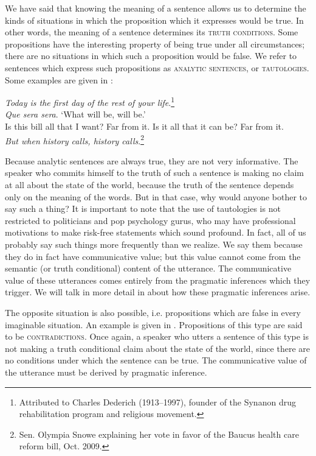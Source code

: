We have said that knowing the meaning of a sentence allows us to determine the kinds of situations in which the proposition which it expresses would be true. In other words, the meaning of a sentence determines its \textsc{truth conditions}. Some propositions have the interesting property of being true under all circumstances; there are no situations in which such a proposition would be false. We refer to sentences which express such propositions as \textsc{analytic sentences}, or \textsc{tautologies}. Some examples are given in :


\ea \label{ex:3.3}
\ea \textit{Today is the first day of the rest of your life}.\footnote{Attributed to Charles Dederich (1913–1997), founder of the Synanon drug rehabilitation program and religious movement.}\\
\ex \textit{Que sera sera}. ‘What will be, will be.’\\
\ex Is this bill all that I want? Far from it. Is it all that it can be? Far from it.\\
  \textit{But when history calls, history calls}.\footnote{Sen. Olympia Snowe explaining her vote in favor of the Baucus health care reform bill, Oct. 2009.}
                       \z
\z


Because analytic sentences are always true, they are not very informative. The speaker who commits himself to the truth of such a sentence is making no claim at all about the state of the world, because the truth of the sentence depends only on the meaning of the words. But in that case, why would anyone bother to say such a thing? It is important to note that the use of tautologies is not restricted to politicians and pop psychology gurus, who may have professional motivations to make risk-free statements which sound profound. In fact, all of us probably say such things more frequently than we realize. We say them because they do in fact have communicative value; but this value cannot come from the semantic (or truth conditional) content of the utterance. The communicative value of these utterances comes entirely from the pragmatic inferences which they trigger. We will talk in more detail in  about how these pragmatic inferences arise.



The opposite situation is also possible, i.e. propositions which are false in every imaginable situation. An example is given in . Propositions of this type are said to be \textsc{contradictions}. Once again, a speaker who utters a sentence of this type is not making a truth conditional claim about the state of the world, since there are no conditions under which the sentence can be true. The communicative value of the utterance must be derived by pragmatic inference.


